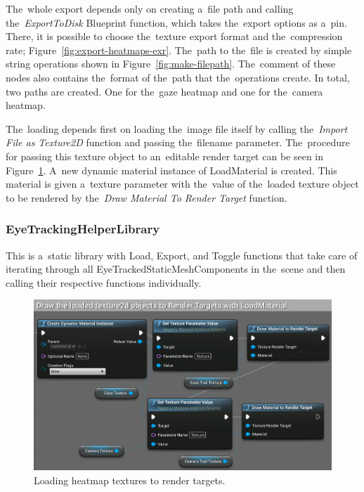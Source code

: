 The~whole export depends only on creating a~file path and calling the~\emph{ExportToDisk} Blueprint function, which takes the~export options as a~pin. There, it is possible to choose the~texture export format and the~compression rate; Figure~\ref{fig:export-heatmaps-exr}. The~path to the~file is created by simple string operations shown in Figure~\ref{fig:make-filepath}. The~comment of these nodes also contains the~format of the~path that the~operations create. In total, two paths are created. One for the~gaze heatmap and one for the~camera heatmap.

The~loading depends first on loading the~image file itself by calling the~\emph{Import File as Texture2D} function and passing the~filename parameter. 
The~procedure for passing this texture object to an~editable render target can be seen in Figure~\ref{fig:load-heatmap-textures}. A~new dynamic material instance of LoadMaterial is created. This material is given a~texture parameter with the~value of the~loaded texture object to be rendered by the~\emph{Draw Material To Render Target} function.

\subsubsection*{EyeTrackingHelperLibrary}

This is a~static library with Load, Export, and Toggle functions that take care of iterating through all EyeTrackedStaticMeshComponents in the~scene and then calling their respective functions individually.

\begin{figure}[!ht]
    \centering
    \includegraphics[width=\textwidth]{img/load-heatmap-textures.png}
    \caption{Loading heatmap textures to render targets.}
    \label{fig:load-heatmap-textures}
\end{figure}


